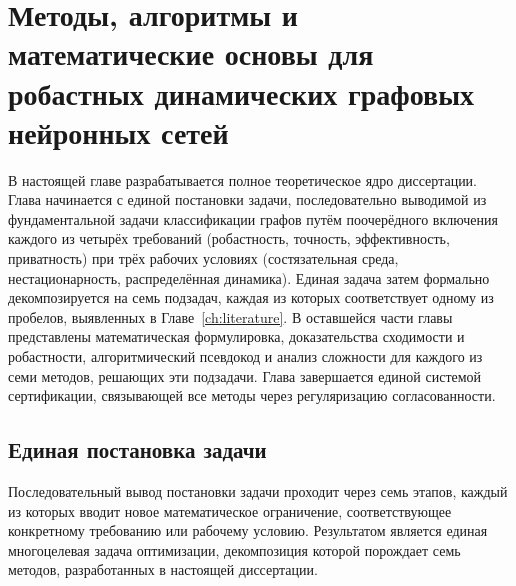
\chapter{Методы, алгоритмы и математические основы для робастных динамических графовых нейронных сетей}
\label{ch:methods}

В настоящей главе разрабатывается полное теоретическое ядро диссертации. Глава начинается с единой постановки задачи, последовательно выводимой из фундаментальной задачи классификации графов путём поочерёдного включения каждого из четырёх требований (робастность, точность, эффективность, приватность) при трёх рабочих условиях (состязательная среда, нестационарность, распределённая динамика). Единая задача затем формально декомпозируется на семь подзадач, каждая из которых соответствует одному из пробелов, выявленных в Главе~\ref{ch:literature}. В оставшейся части главы представлены математическая формулировка, доказательства сходимости и робастности, алгоритмический псевдокод и анализ сложности для каждого из семи методов, решающих эти подзадачи. Глава завершается единой системой сертификации, связывающей все методы через регуляризацию согласованности.


\section{Единая постановка задачи}
\label{sec:unified_problem}
\label{sec:problem_statement}

Последовательный вывод постановки задачи проходит через семь этапов, каждый из которых вводит новое математическое ограничение, соответствующее конкретному требованию или рабочему условию. Результатом является единая многоцелевая задача оптимизации, декомпозиция которой порождает семь методов, разработанных в настоящей диссертации.


